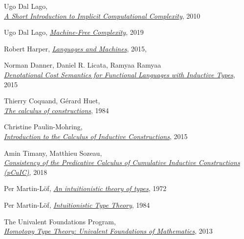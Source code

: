 \documentclass[declaration,mgr,english,shortabstract]{iithesis}
\begin{document}
\begin{thebibliography}{1}
    Ugo Dal Lago, \\
    \href{http://cs.unibo.it/~dallago/FICQRA/esslli.pdf}{\textit{A Short Introduction to Implicit Computational Complexity}}, 2010

    Ugo Dal Lago,
    \href{https://caleidoscope.sciencesconf.org/data/DalLago_caleidoscopeslides.pdf}{\textit{Machine-Free Complexity}},
    2019

    Robert Harper,
    \href{https://existentialtype.wordpress.com/2011/03/16/languages-and-machines/}{\textit{Languages and Machines}}, 2015, \\

    Norman Danner, Daniel R. Licata, Ramyaa Ramyaa \\
    \href{https://dlicata.wescreates.wesleyan.edu/pubs/dlr15inductive/dlr15inductive.pdf}{\textit{Denotational Cost Semantics for Functional Languages with Inductive Types}}, 2015

    Thierry Coquand, Gérard Huet, \\
    \href{https://www.sciencedirect.com/science/article/pii/0890540188900053}{\textit{The calculus of constructions}}, 1984

    Christine Paulin-Mohring, \\
    \href{https://hal.inria.fr/hal-01094195/document}{\textit{Introduction to the Calculus of Inductive Constructions}}, 2015

    Amin Timany, Matthieu Sozeau, \\
    \href{https://hal.inria.fr/hal-01615123v2/document}{\textit{Consistency of the Predicative Calculus of Cumulative Inductive Constructions (pCuIC)}}, 2018

    Per Martin-L\"{o}f,
    \href{https://archive-pml.github.io/martin-lof/pdfs/An-Intuitionistic-Theory-of-Types-1972.pdf}{\textit{An intuitionistic theory of types}}, 1972

    Per Martin-L\"{o}f,
    \href{https://archive-pml.github.io/martin-lof/pdfs/Bibliopolis-Book-retypeset-1984.pdf}{\textit{Intuitionistic Type Theory}}, 1984

    The Univalent Foundations Program, \\
    \href{https://homotopytypetheory.org/book/}{\textit{Homotopy Type Theory: Univalent Foundations of Mathematics}},
    2013


\end{thebibliography}
\end{document}
